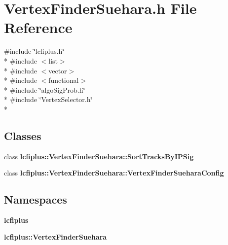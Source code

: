 \section{Vertex\-Finder\-Suehara.\-h File Reference}
\label{VertexFinderSuehara_8h}
{\ttfamily \#include \char`\"{}lcfiplus.\-h\char`\"{}}\\*
{\ttfamily \#include $<$list$>$}\\*
{\ttfamily \#include $<$vector$>$}\\*
{\ttfamily \#include $<$functional$>$}\\*
{\ttfamily \#include \char`\"{}algo\-Sig\-Prob.\-h\char`\"{}}\\*
{\ttfamily \#include \char`\"{}Vertex\-Selector.\-h\char`\"{}}\\*
\subsection*{Classes}
\begin{DoxyCompactItemize}
\item 
class {\bf lcfiplus\-::\-Vertex\-Finder\-Suehara\-::\-Sort\-Tracks\-By\-I\-P\-Sig}
\item 
class {\bf lcfiplus\-::\-Vertex\-Finder\-Suehara\-::\-Vertex\-Finder\-Suehara\-Config}
\end{DoxyCompactItemize}
\subsection*{Namespaces}
\begin{DoxyCompactItemize}
\item 
{\bf lcfiplus}
\item 
{\bf lcfiplus\-::\-Vertex\-Finder\-Suehara}
\end{DoxyCompactItemize}
